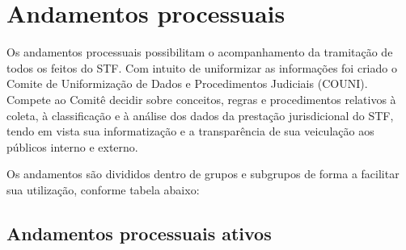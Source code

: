 \documentclass[
]{book}
\begin{document}
\hypertarget{andamentos-processuais}{%
\section{Andamentos processuais}\label{andamentos-processuais}}

Os andamentos processuais possibilitam o acompanhamento da tramitação de todos os feitos do STF. Com intuito de uniformizar as informações foi criado o Comite de Uniformização de Dados e Procedimentos Judiciais (COUNI). Compete ao Comitê decidir sobre conceitos, regras e procedimentos relativos à coleta, à classificação e à análise dos dados da prestação jurisdicional do STF, tendo em vista sua informatização e a transparência de sua veiculação aos públicos interno e externo.

Os andamentos são divididos dentro de grupos e subgrupos de forma a facilitar sua utilização, conforme tabela abaixo:

\hypertarget{andamentos-processuais-ativos}{%
\subsection{Andamentos processuais ativos}\label{andamentos-processuais-ativos}}
\end{document}
